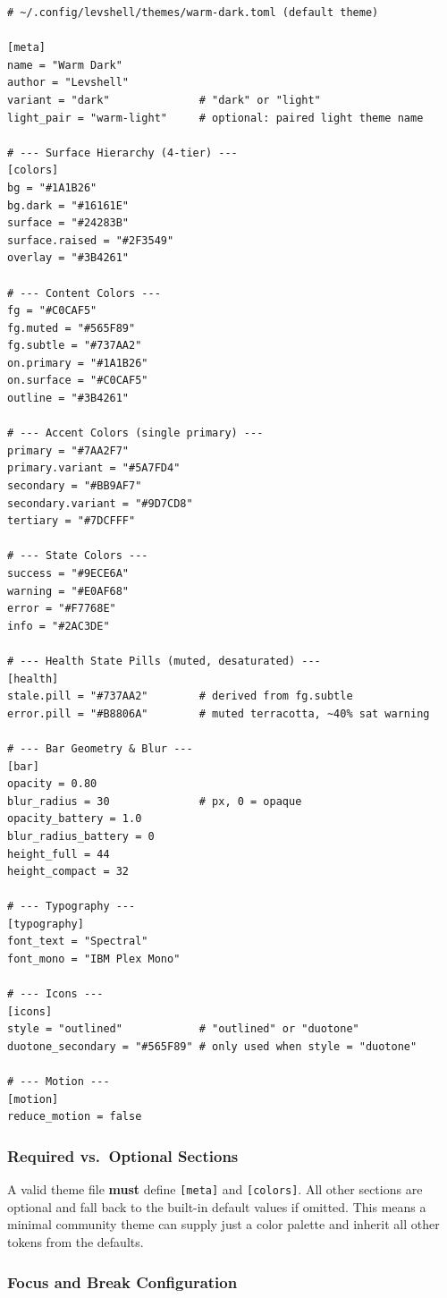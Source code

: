 \documentclass[11pt,a4paper]{article}
\begin{document}
\begin{lstlisting}[language={}]
# ~/.config/levshell/themes/warm-dark.toml (default theme)

[meta]
name = "Warm Dark"
author = "Levshell"
variant = "dark"              # "dark" or "light"
light_pair = "warm-light"     # optional: paired light theme name

# --- Surface Hierarchy (4-tier) ---
[colors]
bg = "#1A1B26"
bg.dark = "#16161E"
surface = "#24283B"
surface.raised = "#2F3549"
overlay = "#3B4261"

# --- Content Colors ---
fg = "#C0CAF5"
fg.muted = "#565F89"
fg.subtle = "#737AA2"
on.primary = "#1A1B26"
on.surface = "#C0CAF5"
outline = "#3B4261"

# --- Accent Colors (single primary) ---
primary = "#7AA2F7"
primary.variant = "#5A7FD4"
secondary = "#BB9AF7"
secondary.variant = "#9D7CD8"
tertiary = "#7DCFFF"

# --- State Colors ---
success = "#9ECE6A"
warning = "#E0AF68"
error = "#F7768E"
info = "#2AC3DE"

# --- Health State Pills (muted, desaturated) ---
[health]
stale.pill = "#737AA2"        # derived from fg.subtle
error.pill = "#B8806A"        # muted terracotta, ~40% sat warning

# --- Bar Geometry & Blur ---
[bar]
opacity = 0.80
blur_radius = 30              # px, 0 = opaque
opacity_battery = 1.0
blur_radius_battery = 0
height_full = 44
height_compact = 32

# --- Typography ---
[typography]
font_text = "Spectral"
font_mono = "IBM Plex Mono"

# --- Icons ---
[icons]
style = "outlined"            # "outlined" or "duotone"
duotone_secondary = "#565F89" # only used when style = "duotone"

# --- Motion ---
[motion]
reduce_motion = false
\end{lstlisting}

\subsubsection{Required vs.\ Optional Sections}

A valid theme file \textbf{must} define \texttt{[meta]} and \texttt{[colors]}. All other sections are optional and fall back to the built-in default values if omitted. This means a minimal community theme can supply just a color palette and inherit all other tokens from the defaults.

\subsubsection{Focus and Break Configuration}
\end{document}
